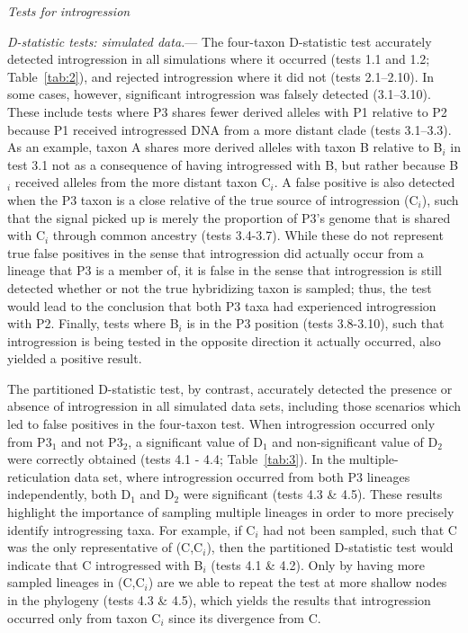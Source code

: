 \documentclass[12pt,letterpaper]{article}
\renewcommand{\subsection}[1]{%
\bigskip
\begin{center}
\begin{large}
\normalfont\itshape #1
\end{large}
\end{center}}
\renewcommand{\subsubsection}[1]{%
\vspace{2ex}
\noindent
\textit{#1.}---}
\begin{document}
\subsection{Tests for introgression}

\subsubsection{D-statistic tests: simulated data}
The four-taxon D-statistic test accurately detected introgression in
all simulations where it occurred (tests 1.1 and 1.2;
Table~\ref{tab:2}), and rejected introgression where it did not
(tests 2.1--2.10). In some cases, however, significant
introgression was falsely detected (3.1--3.10). These include tests
where P3 shares fewer derived alleles with P1 relative to P2 because
P1 received introgressed DNA from a more distant clade (tests
3.1--3.3). As an example, taxon A shares more derived alleles
with taxon B relative to B$_i$ in test 3.1 not as a consequence of
having introgressed with B, but rather because B$_i$ received 
alleles from the more distant taxon C$_i$. %
A false positive is also detected
when the P3 taxon is a close relative of the true source of
introgression (C$_i$), such that the signal picked up is merely the
proportion of P3's genome that is shared with C$_i$ through common
ancestry (tests 3.4-3.7). While these do not represent true false
positives in the sense that introgression did actually occur from a
lineage that P3 is a member of, it is false in the sense that
introgression is still detected whether or not the true hybridizing
taxon is sampled; thus, the test would lead to the conclusion that
both P3 taxa had experienced introgression with P2.  Finally, tests
where B$_i$ is in the P3 position (tests 3.8-3.10), such that
introgression is being tested in the opposite direction it actually
occurred, also yielded a positive result.

The partitioned D-statistic test, by contrast, accurately detected the
presence or absence of introgression in all simulated data sets,
including those scenarios which led to false positives in the
four-taxon test. When introgression occurred only from P3$_1$ and not
P3$_2$, a significant value of D$_1$ and non-significant value of
D$_2$ were correctly obtained (tests 4.1 - 4.4; Table~\ref{tab:3}). In
the multiple-reticulation data set, where introgression occurred from
both P3 lineages independently, both D$_1$ and D$_2$ were significant
(tests 4.3 \& 4.5). These results highlight the importance of sampling
multiple lineages in order to more precisely identify introgressing
taxa. For example, if C$_i$ had not been sampled, such that C was the
only representative of (C,C$_i$), then the partitioned D-statistic test
would indicate that C introgressed with B$_i$ (tests 4.1 \& 4.2). Only
by having more sampled lineages in (C,C$_i$) are we able to repeat the
test at more shallow nodes in the phylogeny (tests 4.3 \& 4.5), which
yields the results that introgression occurred only from taxon C$_i$
since its divergence from C.
\end{document}
